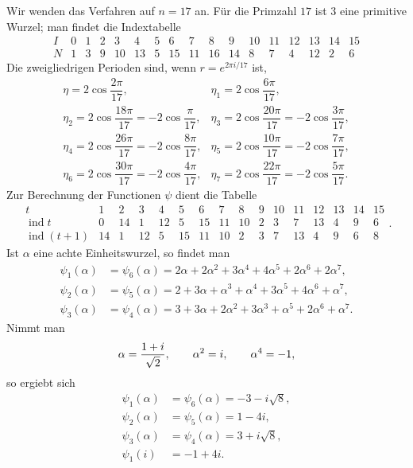 \documentclass[11pt]{article}
\providecommand{\ind}{\operatorname{ind}}
\begin{document}
Wir wenden das Verfahren auf $n=17$ an. Für die Primzahl $17$ ist $3$ eine primitive Wurzel; man findet die Indextabelle
\[
\begin{array}{c|rrrrrrrrrrrrrrrr}
I&0&1&2&3&4&5&6&7&8&9&10&11&12&13&14&15\\ \hline
N&1&3&9&10&13&5&15&11&16&14&8&7&4&12&2&6
\end{array}                                                            \tag{14}
\]
Die zweigliedrigen Perioden sind, wenn $r=e^{2\pi i/17}$ ist,
\[
\begin{array}{ll}
\eta=2\cos\dfrac{2\pi}{17},
&\eta_1=2\cos\dfrac{6\pi}{17},\\[0.5em]
\eta_2=2\cos\dfrac{18\pi}{17}=-2\cos\dfrac{\pi}{17},
&\eta_3=2\cos\dfrac{20\pi}{17}=-2\cos\dfrac{3\pi}{17},\\[0.5em]
\eta_4=2\cos\dfrac{26\pi}{17}=-2\cos\dfrac{8\pi}{17},
&\eta_5=2\cos\dfrac{10\pi}{17}=-2\cos\dfrac{7\pi}{17},\\[0.5em]
\eta_6=2\cos\dfrac{30\pi}{17}=-2\cos\dfrac{4\pi}{17},
&\eta_7=2\cos\dfrac{22\pi}{17}=-2\cos\dfrac{5\pi}{17}.
\end{array}                                                            \tag{15}
\]
Zur Berechnung der Functionen $\psi$ dient die Tabelle
\[
\begin{array}{c|rrrrrrrrrrrrrrr}
t&1&2&3&4&5&6&7&8&9&10&11&12&13&14&15\\ \hline
\ind t&0&14&1&12&5&15&11&10&2&3&7&13&4&9&6\\
\ind(t+1)&14&1&12&5&15&11&10&2&3&7&13&4&9&6&8
\end{array}.                                                           \tag{16}
\]
Ist $\alpha$ eine achte Einheitswurzel, so findet man
\[
\begin{aligned}
\psi_1(\alpha)&=\psi_6(\alpha)=2\alpha+2\alpha^2+3\alpha^4+4\alpha^5+2\alpha^6+2\alpha^7,\\
\psi_2(\alpha)&=\psi_5(\alpha)=2+3\alpha+\alpha^3+
\alpha^4+3\alpha^5+4\alpha^6+
\alpha^7,\\
\psi_3(\alpha)&=\psi_4(\alpha)=3+3\alpha+2\alpha^2+3\alpha^3+
\alpha^5+2\alpha^6+
\alpha^7.
\end{aligned}                                                          \tag{17}
\]
Nimmt man
\[
        \alpha={1+i\over \sqrt2},
        \qquad \alpha^2=i,
        \qquad \alpha^4=-1,
\]
so ergiebt sich
\[
\begin{aligned}
\psi_1(\alpha)&=\psi_6(\alpha)=-3-i\sqrt8,\\
\psi_2(\alpha)&=\psi_5(\alpha)=1-4i,\\
\psi_3(\alpha)&=\psi_4(\alpha)=3+i\sqrt8,\\
\psi_1(i)&=-1+4i.
\end{aligned}                                                          \tag{18}
\]
\end{document}
